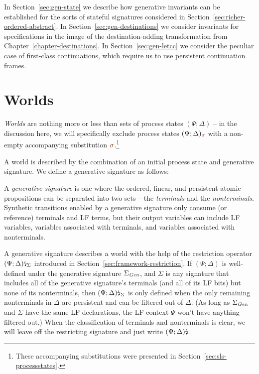 In Section~\ref{sec:gen-state}
we describe how generative invariants can be established for the sorts
of stateful signatures considered in
Section~\ref{sec:richer-ordered-abstract}. In
Section~\ref{sec:gen-destinations} we consider invariants for
specifications in the image of the destination-adding transformation
from Chapter~\ref{chapter-destinations}.  In
Section~\ref{sec:gen-letcc} we consider the peculiar case of
first-class continuations, which require us to use persistent
continuation frames. 

\section{Worlds}
\label{sec:gen-worlds}

{\it Worlds} are nothing more or less than sets of process states
$(\Psi; \Delta)$ -- in the discussion here, we will specifically
exclude process states $(\Psi; \Delta)_{\lf\sigma}$ with a non-empty
accompanying substitution $\lf\sigma$.\footnote{These accompanying
  substitutions were presented in
  Section~\ref{sec:sls-processstates}.}

A world is described by the combination of an initial process state
and generative signature. We define a generative
signature as follows:

\bigskip
\begin{definition}\label{def:gensig}
  A {\em generative signature} is one where the ordered, linear, and
  persistent atomic propositions can be separated into two sets -- the
  {\em terminals} and the {\em nonterminals}. Synthetic transitions
  enabled by a generative signature only consume (or reference) 
  terminals and LF terms, but their output variables can include
  LF variables, variables associated with terminals, and variables
  associated with nonterminals.
\end{definition}
\bigskip

\noindent
A generative signature describes a world with the help of the
restriction operator ${(\Psi; \Delta)}{\mbox{\lightning}}_{\Sigma}$ introduced
in Section~\ref{sec:framework-restriction}. If $(\Psi; \Delta)$ is
well-defined under the generative signature $\Sigma_{\it Gen}$, and
$\Sigma$ is any signature that includes all of the generative
signature's terminals (and all of its LF bits) but none of its
nonterminals, then ${(\Psi; \Delta)}{\mbox{\lightning}}_{\Sigma}$ is only
defined when the only remaining nonterminals in $\Delta$ are
persistent and can be filtered out of $\Delta$. (As long as
$\Sigma_{\it Gen}$ and $\Sigma$ have the same LF declarations, the LF
context $\Psi$ won't have anything filtered out.) When the
classification of terminals and nonterminals is clear, we will leave
off the restricting signature and just write ${(\Psi;
  \Delta)}{\mbox{\lightning}}_{}$.

